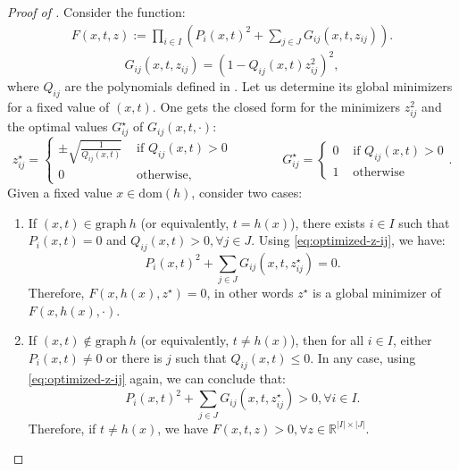 \documentclass{article}
\newcommand*{\RR}{\mathbb{R}}
\newcommand{\graph}{\mathrm{graph}\ }
\newcommand{\firstvar}{x}
\newcommand{\dom}{\mathrm{dom}}
\theoremstyle{plain}
\theoremstyle{definition}
\begin{document}
\begin{proof}[Proof of ]
\noindent
    Consider the function:
    \begin{equation}
        \label{eq:def-F}
        \begin{aligned}
            F(\firstvar, t, z) :=  \prod_{i \in I} \left(P_i(\firstvar,t)^2 + \sum_{j \in J} G_{ij}(x,t,z_{ij})\right).
        \end{aligned}
    \end{equation}
    \begin{equation*}
        G_{ij}(x,t,z_{ij}) = (1 - Q_{ij}(x,t)z_{ij}^2)^2,
    \end{equation*}
    where $Q_{ij}$ are the polynomials defined in . Let us determine its global minimizers for a fixed value of $(x,t)$. One gets the closed form for the minimizers $z_{ij}^2$ and the optimal values $G_{ij}^\star$ of $G_{ij}(x,t,\cdot)$:
    \begin{equation}
        \label{eq:optimized-z-ij}
        z_{ij}^\star = \begin{cases}
            \pm \sqrt{\frac{1}{Q_{ij}(x,t)}} & \text{ if } Q_{ij}(x,t) > 0\\
            0 & \text{ otherwise,}
        \end{cases} \qquad \qquad
        G_{ij}^\star = \begin{cases}
            0 & \text{ if } Q_{ij}(x,t) > 0\\
            1 & \text{ otherwise}
        \end{cases}.
    \end{equation}
    Given a fixed value $x \in \dom(h)$, consider two cases:
    \begin{enumerate}[leftmargin=*]
        \item If $(x,t) \in \graph h$ (or equivalently, $t = h(x)$), there exists $i \in I$ such that $P_i(x,t) = 0$ and $Q_{ij}(x, t) > 0, \forall j \in J$. Using \eqref{eq:optimized-z-ij}, we have:
        \begin{equation*}
            P_i(x,t)^2 + \sum_{j \in J} G_{ij}(x,t,z_{ij}^\star) = 0.
        \end{equation*}
        Therefore, $F(x,h(x),z^\star) = 0$, in other words $z^\star$ is a global minimizer of $F(x,h(x),\cdot)$. 
        \item If $(x,t) \notin \graph h$ (or equivalently, $t \neq h(x)$), then for all $i \in I$, either $P_i(x,t) \neq 0$ or there is $j$ such that $Q_{ij}(x,t) \leq 0$. In any case, using \eqref{eq:optimized-z-ij} again, we can conclude that:
        \begin{equation*}
            P_i(x,t)^2 + \sum_{j \in J} G_{ij}(x,t,z_{ij}^\star) > 0, \forall i \in I.
        \end{equation*}
        Therefore, if $t \neq h(x)$, we have $F(x,t,z) > 0, \forall z \in \RR^{|I| \times |J|}$. 
    \end{enumerate}
    

\end{proof}
\end{document}
